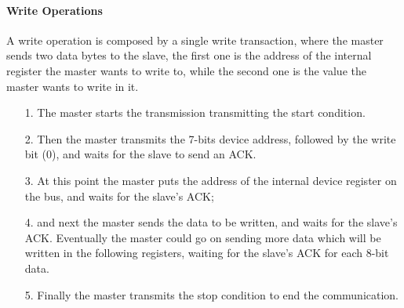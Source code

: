 \paragraph{Write Operations}
A write operation is composed by a single write transaction, where the master sends two data bytes to the slave, the first one is the address of the internal register the master wants to write to, while the second one is the value the master wants to write in it.
\begin{itemize}
	\item[1. ] The master starts the transmission transmitting the start condition.
	\item[2. ] Then the master transmits the 7-bits device address, followed by the write bit (0), and waits for the slave to send an ACK.
	\item[3. ] At this point the master puts the address of the internal device register on the bus, and waits for the slave's ACK;
	\item[4. ] and next the master sends the data to be written, and waits for the slave's ACK. Eventually the master could go on sending more data which will be written in the following registers, waiting for the slave's ACK for each 8-bit data.
	\item[5. ] Finally the master transmits the stop condition to end the communication.
\end{itemize}


